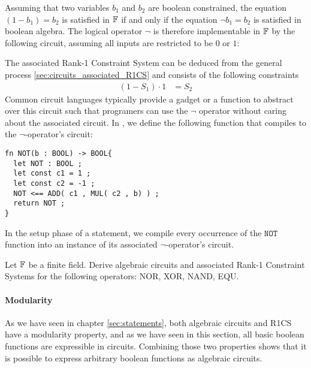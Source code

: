 Assuming that two variables $b_1$ and $b_2$ are boolean constrained, the equation $(1-b_1) = b_2$ is satisfied in $\mathbb{F}$ if and only if the equation $\lnot b_1 = b_2$ is satisfied in boolean algebra. The logical operator $\lnot$ is therefore implementable in $\mathbb{F}$ by the following circuit, assuming all inputs are restricted to be $0$ or $1$:
\begin{center}
\end{center}
The associated Rank-1 Constraint System can be deduced from the general process \ref{sec:circuits_associated_R1CS} and consists of the following constraints
\begin{align*}
  (1-S_1)\cdot 1 &= S_2
\end{align*}
Common circuit languages typically provide a gadget or a function to abstract over this circuit such that programers can use the $\lnot$ operator without caring about the associated circuit. In , we define the following function that compiles to the $\lnot$-operator's circuit:
\begin{lstlisting}
fn NOT(b : BOOL) -> BOOL{
  let NOT : BOOL ;
  let const c1 = 1 ;
  let const c2 = -1 ;
  NOT <== ADD( c1 , MUL( c2 , b) ) ;
  return NOT ;
}
\end{lstlisting}
In the setup phase of a statement, we compile every occurrence of the $\mathtt{NOT}$ function into an instance of its associated $\lnot$-operator's circuit.
\begin{exercise}
Let $\mathbb{F}$ be a finite field. Derive algebraic circuits and associated Rank-1 Constraint Systems for the following operators: NOR, XOR, NAND, EQU.
\end{exercise}
\paragraph{Modularity} As we have seen in chapter \ref{sec:statements}, both algebraic circuits and R1CS have a modularity property, and as we have seen in this section, all basic boolean functions are expressible in circuits. Combining those two properties shows that it is possible to express arbitrary boolean functions as algebraic circuits.

